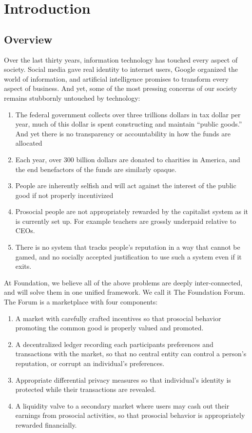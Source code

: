 \section{\textbf{Introduction}}

\subsection{Overview}

Over the last thirty years, information technology has touched every aspect of society. Social media gave real identity to internet users, Google organized the world of information, and artificial intelligence promises to transform every aspect of business. And yet, some of the most pressing concerns of our society remains stubbornly untouched by technology:

\begin{enumerate}
	\item The federal government collects over three trillions dollars in tax dollar per year, much of this dollar is spent constructing and maintain “public goods.” And yet there is no transparency or accountability in how the funds are allocated
	\item Each year, over 300 billion dollars are donated to charities in America, and the end benefactors of the funds are similarly opaque. 
	\item People are inherently selfish and will act against the interest of the public good if not properly incentivized
	\item Prosocial people are not appropriately rewarded by the capitalist system as it is currently set up. For example teachers are grossly underpaid relative to CEOs.
	\item There is no system that tracks people’s reputation in a way that cannot be gamed, and no socially accepted justification to use such a system even if it exits.
\end{enumerate}


At Foundation, we believe all of the above problems are deeply inter-connected, and will solve them in one unified framework. We call it The Foundation Forum. The Forum is a marketplace with four components:

\begin{enumerate}
	\item A market with carefully crafted incentives so that prosocial behavior promoting the common good is properly valued and promoted.
	\item A decentralized ledger recording each participants preferences and transactions with the market, so that no central entity can control a person’s reputation, or corrupt an individual’s preferences. 
	\item Appropriate differential privacy measures so that individual’s identity is protected while their transactions are revealed.
	\item A liquidity valve to a secondary market where users may cash out their earnings from prosocial activities, so that prosocial behavior is appropriately rewarded financially.  
\end{enumerate}


